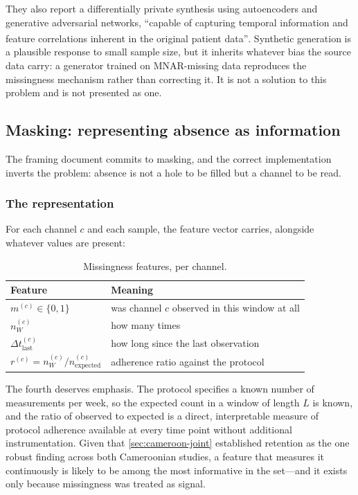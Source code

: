 \documentclass[12pt,a4paper,oneside]{report}
\newcommand{\bq}[1]{``#1''\textsuperscript{\dag}}
\begin{document}
They also report a differentially private synthesis using autoencoders and generative adversarial networks, \bq{capable of capturing temporal information and feature correlations inherent in the original patient data}. Synthetic generation is a plausible response to small sample size, but it inherits whatever bias the source data carry: a generator trained on MNAR-missing data reproduces the missingness mechanism rather than correcting it. It is not a solution to this problem and is not presented as one.

\subsection{Masking: representing absence as information}\label{sec:masking}

The framing document commits to masking, and the correct implementation inverts the problem: absence is not a hole to be filled but a channel to be read.

\subsubsection{The representation}

For each channel $c$ and each sample, the feature vector carries, alongside whatever values are present:

\begin{table}[htbp]
\centering\small
\caption{Missingness features, per channel.}\label{tab:mask-features}
\begin{tabularx}{\textwidth}{@{}>{\raggedright\arraybackslash}p{4.2cm} X@{}}
\toprule
\textbf{Feature} & \textbf{Meaning} \\
\midrule
$m^{(c)} \in \{0,1\}$ & was channel $c$ observed in this window at all \\
$n^{(c)}_W$ & how many times \\
$\Delta t^{(c)}_{\text{last}}$ & how long since the last observation \\
$r^{(c)} = n^{(c)}_W / n^{(c)}_{\text{expected}}$ & adherence ratio against the protocol \\
\bottomrule
\end{tabularx}
\end{table}

The fourth deserves emphasis. The protocol specifies a known number of measurements per week, so the expected count in a window of length $L$ is known, and the ratio of observed to expected is a direct, interpretable measure of protocol adherence available at every time point without additional instrumentation. Given that \cref{sec:cameroon-joint} established retention as the one robust finding across both Cameroonian studies, a feature that measures it continuously is likely to be among the most informative in the set---and it exists only because missingness was treated as signal.
\end{document}
